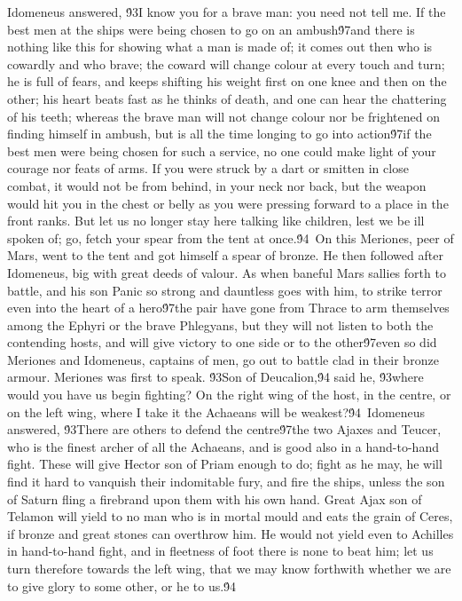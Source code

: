 {Idomeneus answered, \'93I know you for a brave man: you need not tell me. If the best men at the ships were being chosen to go on an ambush\'97and there is nothing like this for showing what a man is made of; it comes out then who is cowardly and who brave; the coward will change colour at every touch and turn; he is full of fears, and keeps shifting his weight first on one knee and then on the other; his heart beats fast as he thinks of death, and one can hear the chattering of his teeth; whereas the brave man will not change colour nor be frightened on finding himself in ambush, but is all the time longing to go into action\'97if the best men were being chosen for such a service, no one could make light of your courage nor feats of arms. If you were struck by a dart or smitten in close combat, it would not be from behind, in your neck nor back, but the weapon would hit you in the chest or belly as you were pressing forward to a place in the front ranks. But let us no longer stay here talking like children, lest we be ill spoken of; go, fetch your spear from the tent at once.\'94\
On this Meriones, peer of Mars, went to the tent and got himself a spear of bronze. He then followed after Idomeneus, big with great deeds of valour. As when baneful Mars sallies forth to battle, and his son Panic so strong and dauntless goes with him, to strike terror even into the heart of a hero\'97the pair have gone from Thrace to arm themselves among the Ephyri or the brave Phlegyans, but they will not listen to both the contending hosts, and will give victory to one side or to the other\'97even so did Meriones and Idomeneus, captains of men, go out to battle clad in their bronze armour. Meriones was first to speak. \'93Son of Deucalion,\'94 said he, \'93where would you have us begin fighting? On the right wing of the host, in the centre, or on the left wing, where I take it the Achaeans will be weakest?\'94\
Idomeneus answered, \'93There are others to defend the centre\'97the two Ajaxes and Teucer, who is the finest archer of all the Achaeans, and is good also in a hand-to-hand fight. These will give Hector son of Priam enough to do; fight as he may, he will find it hard to vanquish their indomitable fury, and fire the ships, unless the son of Saturn fling a firebrand upon them with his own hand. Great Ajax son of Telamon will yield to no man who is in mortal mould and eats the grain of Ceres, if bronze and great stones can overthrow him. He would not yield even to Achilles in hand-to-hand fight, and in fleetness of foot there is none to beat him; let us turn therefore towards the left wing, that we may know forthwith whether we are to give glory to some other, or he to us.\'94\
}
